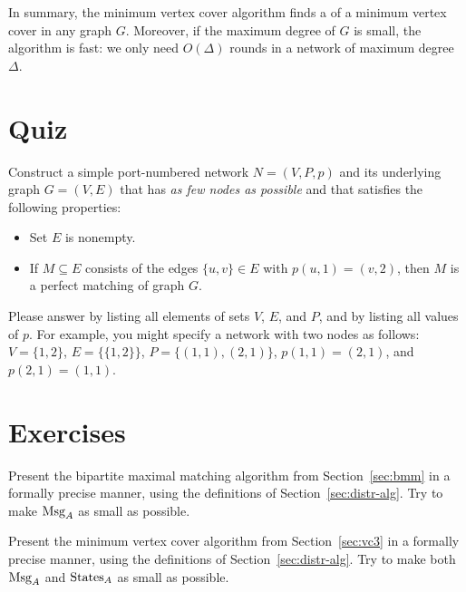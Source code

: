In summary, the minimum vertex cover algorithm finds a  of a minimum vertex cover in any graph $G$. Moreover, if the maximum degree of $G$ is small, the algorithm is fast: we only need $O(\Delta)$ rounds in a network of maximum degree $\Delta$.

\section{Quiz}

Construct a simple port-numbered network $N = (V,P,p)$ and its underlying graph $G = (V,E)$ that has \emph{as few nodes as possible} and that satisfies the following properties:
\begin{itemize}[noitemsep]
    \item Set $E$ is nonempty.
    \item If $M \subseteq E$ consists of the edges $\{u,v\} \in E$ with $p(u,1) = (v,2)$, then $M$ is a perfect matching of graph $G$.
\end{itemize}
Please answer by listing all elements of sets $V$, $E$, and $P$, and by listing all values of $p$. For example, you might specify a network with two nodes as follows: $V = \{1,2\}$, $E = \{ \{1,2\} \}$, $P = \{ (1,1), (2,1) \}$, $p(1,1) = (2,1)$, and $p(2,1) = (1,1)$.

\section{Exercises}

\begin{ex}
    Present the bipartite maximal matching algorithm from Section~\ref{sec:bmm} in a formally precise manner, using the definitions of Section~\ref{sec:distr-alg}. Try to make $\operatorname{Msg}_A$ as small as possible.
\end{ex}

\begin{ex}
    Present the minimum vertex cover  algorithm from Section~\ref{sec:vc3} in a formally precise manner, using the definitions of Section~\ref{sec:distr-alg}. Try to make both $\operatorname{Msg}_A$ and $\operatorname{States}_A$ as small as possible.
    
\end{ex}

